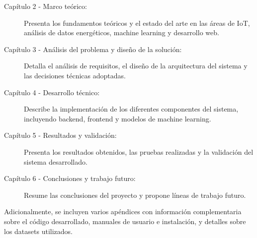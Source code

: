 \begin{description}
    \item[Capítulo 2 - Marco teórico:] Presenta los fundamentos teóricos y el estado del arte en las áreas de IoT, análisis de datos energéticos, machine learning y desarrollo web.
    
    \item[Capítulo 3 - Análisis del problema y diseño de la solución:] Detalla el análisis de requisitos, el diseño de la arquitectura del sistema y las decisiones técnicas adoptadas.
    
    \item[Capítulo 4 - Desarrollo técnico:] Describe la implementación de los diferentes componentes del sistema, incluyendo backend, frontend y modelos de machine learning.
    
    \item[Capítulo 5 - Resultados y validación:] Presenta los resultados obtenidos, las pruebas realizadas y la validación del sistema desarrollado.
    
    \item[Capítulo 6 - Conclusiones y trabajo futuro:] Resume las conclusiones del proyecto y propone líneas de trabajo futuro.
\end{description}

Adicionalmente, se incluyen varios apéndices con información complementaria sobre el código desarrollado, manuales de usuario e instalación, y detalles sobre los datasets utilizados.

